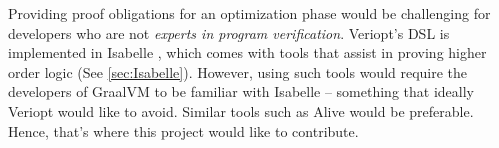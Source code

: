 Providing proof obligations for an optimization phase would be challenging for developers who are not \emph{experts in program verification}. Veriopt's 
DSL is implemented in Isabelle \cite{IsabelleHOL}, which comes with tools that assist in proving higher order logic (See \ref{sec:Isabelle}). 
However, using such tools would require the developers of GraalVM to be familiar with Isabelle -- something that ideally Veriopt would like to avoid. 
Similar tools such as Alive \cite{AliveInLean} would be preferable. Hence, that's where this project would like to contribute.